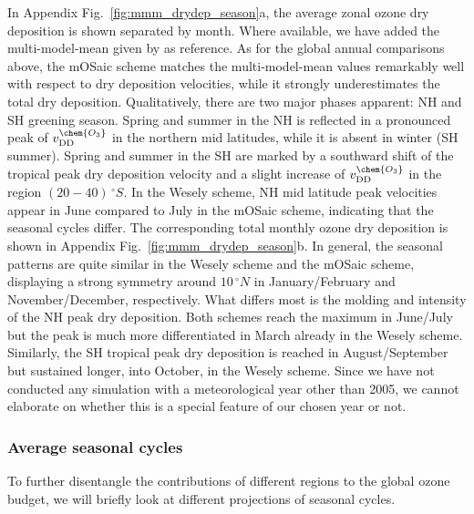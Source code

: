 \documentclass[gmd, manuscript]{copernicus}
\begin{document}
In Appendix Fig.~\ref{fig:mmm_drydep_season}a, the average zonal ozone dry deposition is shown separated by month. Where available, we have added the multi-model-mean given by \citet{ACP:Hardacre2015} as reference. As for the global annual comparisons above, the mOSaic scheme matches the multi-model-mean values remarkably well with respect to dry deposition velocities, while it strongly underestimates the total dry deposition. Qualitatively, there are two major phases apparent: NH and SH greening season. Spring and summer in the NH is reflected in a pronounced peak of $v_\text{DD}^\chem{O_3}$ in the northern mid latitudes, while it is absent in winter (SH summer). Spring and summer in the SH are marked by a southward shift of the tropical peak dry deposition velocity and a slight increase of $v_\text{DD}^\chem{O_3}$ in the region $(20-40)\,\unit{^\circ S}$. In the Wesely scheme, NH mid latitude peak velocities appear in June compared to July in the mOSaic scheme, indicating that the seasonal cycles differ. The corresponding total monthly ozone dry deposition is shown in Appendix Fig.~\ref{fig:mmm_drydep_season}b. In general, the seasonal patterns are quite similar in the Wesely scheme and the mOSaic scheme, displaying a strong symmetry around $10\,\unit{^\circ N}$ in January/February and November/December, respectively. What differs most is the molding and intensity of the NH peak dry deposition. Both schemes reach the maximum in June/July but the peak is much more differentiated in March already in the Wesely scheme. Similarly, the SH tropical peak dry deposition is reached in August/September but sustained longer, into October, in the Wesely scheme. Since we have not conducted any simulation with a meteorological year other than 2005, we cannot elaborate on whether this is a special feature of our chosen year or not.
%
\subsubsection{Average seasonal cycles}
\label{subsubsec:seasons}
%
To further disentangle the contributions of different regions to the global ozone budget, we will briefly look at different projections of seasonal cycles.
\end{document}
